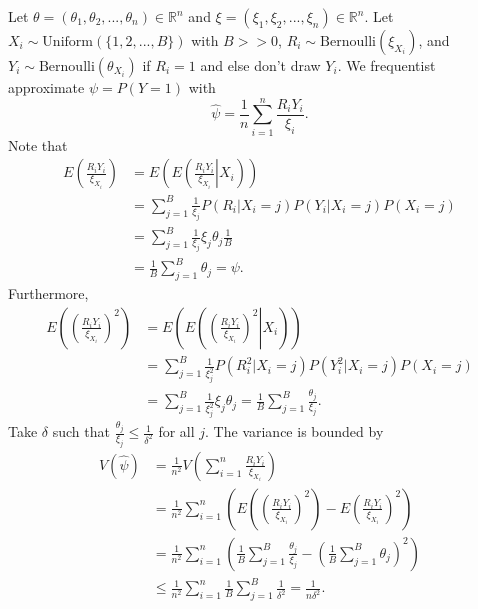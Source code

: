 Let $\theta = (\theta_1, \theta_2, ..., \theta_n) \in \mathbb{R}^n$ and $\xi = (\xi_1, \xi_2, ..., \xi_n) \in \mathbb{R}^n$.
Let $X_i \sim \mathrm{Uniform}(\{1, 2, ..., B\})$ with $B >> 0$, $R_i \sim \mathrm{Bernoulli}(\xi_{X_i})$, and $Y_i \sim \mathrm{Bernoulli}(\theta_{X_i})$ if $R_i = 1$ and else don't draw $Y_i$.
We frequentist approximate $\psi = P(Y = 1)$ with
\begin{equation*}
    \hat{\psi} = \frac{1}{n} \sum_{i = 1}^n \frac{R_i Y_i}{\xi_i}.
\end{equation*}
Note that
\begin{equation*}
    \begin{split}
        E\left(\frac{R_i Y_i}{\xi_{X_i}}\right)
            &= E\left(E\left(\left.\frac{R_i Y_i}{\xi_{X_i}}\right|X_i\right)\right) \\
            &= \sum_{j = 1}^B \frac{1}{\xi_j} P(R_i|X_i=j) P(Y_i|X_i=j) P(X_i=j) \\
            &= \sum_{j = 1}^B \frac{1}{\xi_j} \xi_j \theta_j \frac{1}{B} \\
            &= \frac{1}{B} \sum_{j = 1}^B \theta_j
            = \psi.
    \end{split}
\end{equation*}
Furthermore,
\begin{equation*}
    \begin{split}
        E\left(\left(\frac{R_i Y_i}{\xi_{X_i}}\right)^2\right)
            &= E\left(E\left(\left.\left(\frac{R_i Y_i}{\xi_{X_i}}\right)^2\right|X_i\right)\right) \\
            &= \sum_{j = 1}^B \frac{1}{\xi_j^2} P(R_i^2|X_i=j) P(Y_i^2|X_i=j) P(X_i=j) \\
            &= \sum_{j = 1}^B \frac{1}{\xi_j^2} \xi_j \theta_j
            = \frac{1}{B} \sum_{j = 1}^B \frac{\theta_j}{\xi_j}.
    \end{split}
\end{equation*}
Take $\delta$ such that $\frac{\theta_j}{\xi_j} \leq \frac{1}{\delta^2}$ for all $j$.
The variance is bounded by
\begin{equation*}
    \begin{split}
        V(\hat{\psi}) &= \frac{1}{n^2} V\left(\sum_{i = 1}^n \frac{R_i Y_i}{\xi_{X_i}}\right) \\
            &= \frac{1}{n^2} \sum_{i = 1}^n \left(E\left(\left(\frac{R_i Y_i}{\xi_{X_i}}\right)^2\right) - E\left(\frac{R_i Y_i}{\xi_{X_i}}\right)^2\right) \\
            &= \frac{1}{n^2} \sum_{i = 1}^n \left(\frac{1}{B}\sum_{j = 1}^B \frac{\theta_j}{\xi_j} - \left(\frac{1}{B}\sum_{j = 1}^B \theta_j\right)^2\right) \\
            &\leq \frac{1}{n^2} \sum_{i = 1}^n \frac{1}{B} \sum_{j = 1}^B \frac{1}{\delta^2}
            = \frac{1}{n \delta^2}.
    \end{split}
\end{equation*}
